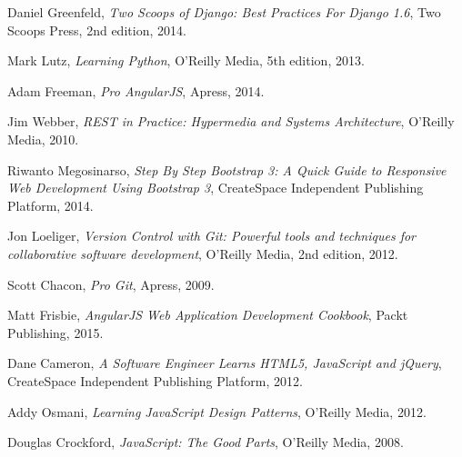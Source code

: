 \begin{thebibliography}{9}


Daniel Greenfeld,
 \emph{Two Scoops of Django: Best Practices For Django 1.6},
 Two Scoops Press,
 2nd edition,
 2014.

Mark Lutz,
 \emph{Learning Python},
 O'Reilly Media,
 5th edition,
 2013.

Adam Freeman,
 \emph{Pro AngularJS},
 Apress,
 2014.

Jim Webber,
 \emph{REST in Practice: Hypermedia and Systems Architecture},
 O'Reilly Media,
 2010.

Riwanto Megosinarso,
 \emph{Step By Step Bootstrap 3: A Quick Guide to Responsive Web Development Using Bootstrap 3},
 CreateSpace Independent Publishing Platform,
 2014.

Jon Loeliger,
 \emph{Version Control with Git: Powerful tools and techniques for collaborative software development},
 O'Reilly Media,
 2nd edition,
 2012.

Scott Chacon,
 \emph{Pro Git},
 Apress,
 2009.

Matt Frisbie,
 \emph{AngularJS Web Application Development Cookbook},
 Packt Publishing,
 2015.

Dane Cameron,
 \emph{A Software Engineer Learns HTML5, JavaScript and jQuery},
 CreateSpace Independent Publishing Platform,
 2012.

Addy Osmani,
 \emph{Learning JavaScript Design Patterns},
 O'Reilly Media,
 2012.

Douglas Crockford,
 \emph{JavaScript: The Good Parts},
 O'Reilly Media,
 2008.


\end{thebibliography}